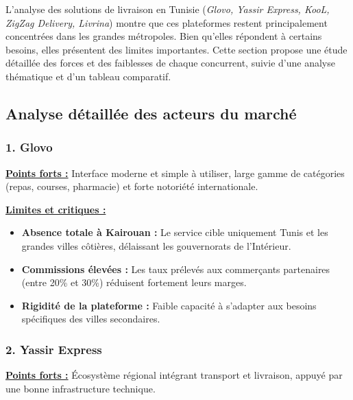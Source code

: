 \documentclass[12pt,fleqn,a4paper]{report}
\begin{document}
\begin{justify}
L'analyse des solutions de livraison en Tunisie (\textit{Glovo, Yassir Express, KooL, ZigZag Delivery, Livrina}) montre que ces plateformes restent principalement concentrées dans les grandes métropoles. Bien qu'elles répondent à certains besoins, elles présentent des limites importantes. Cette section propose une étude détaillée des forces et des faiblesses de chaque concurrent, suivie d'une analyse thématique et d'un tableau comparatif.

\subsection{Analyse détaillée des acteurs du marché}

\subsubsection*{\Large \textbf{1. Glovo}}
\vspace{0.2cm}

\noindent \textbf{\underline{Points forts :}}
Interface moderne et simple à utiliser, large gamme de catégories (repas, courses, pharmacie) et forte notoriété internationale.

\vspace{0.2cm}
\noindent \textbf{\underline{Limites et critiques :}}
\begin{itemize}
    \item \textbf{Absence totale à Kairouan :} Le service cible uniquement Tunis et les grandes villes côtières, délaissant les gouvernorats de l'Intérieur.
    \item \textbf{Commissions élevées :} Les taux prélevés aux commerçants partenaires (entre 20\% et 30\%) réduisent fortement leurs marges.
    \item \textbf{Rigidité de la plateforme :} Faible capacité à s'adapter aux besoins spécifiques des villes secondaires.
\end{itemize}

\vspace{0.5cm}

\subsubsection*{\Large \textbf{2. Yassir Express}}
\vspace{0.2cm}

\noindent \textbf{\underline{Points forts :}}
Écosystème régional intégrant transport et livraison, appuyé par une bonne infrastructure technique.


\end{justify}
\end{document}
